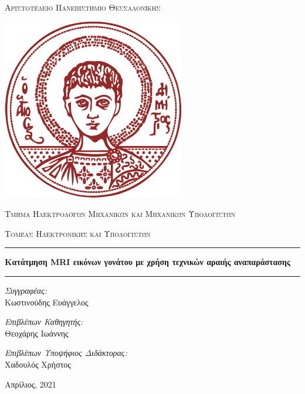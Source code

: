 \documentclass[a4paper,12pt]{article}
\newcommand{\HRule}{\rule{\linewidth}{0.5mm}}
\begin{document}
\begin{titlepage}

\center
 
\textsc{\LARGE Αριστοτέλειο Πανεπιστήμιο Θεσσαλονίκης}


\includegraphics[scale=.3]{LogoAUTH72ppi.png}

\textsc{\Large Τμήμα Ηλεκτρολόγων Μηχανικών και Μηχανικών Υπολογιστών}
\vspace{0.5cm}

\textsc{\large Τομέας Ηλεκτρονικής και Υπολογιστών}
\vspace{0.5cm}

\HRule
\vspace{0.4cm}
{ \huge \bfseries Κατάτμηση MRI εικόνων γονάτου με χρήση τεχνικών αραιής
                  αναπαράστασης}
\vspace{0.4cm}
\HRule
\vspace{1cm}

\begin{minipage}{0.8\textwidth}
    \center
    \large
    \emph{Συγγραφέας:} \\ 
    \Large
    Κωστινούδης Ευάγγελος
\end{minipage}
\vspace{0.5cm}

\begin{minipage}{0.8\textwidth}
    \center
    \large
    \emph{Επιβλέπων Καθηγητής:} \\ 
    \Large
    Θεοχάρης Ιωάννης \\
\end{minipage}
\vspace{0.5cm}

\begin{minipage}{0.8\textwidth}
    \center
    \large
    \emph{Επιβλέπων Υποψήφιος Διδάκτορας:} \\ 
    \Large
    Χαδουλός Χρήστος
\end{minipage}
\vspace{0.5cm}

\vspace*{\fill}

{\large Απρίλιος, 2021}

\end{titlepage}
\end{document}
